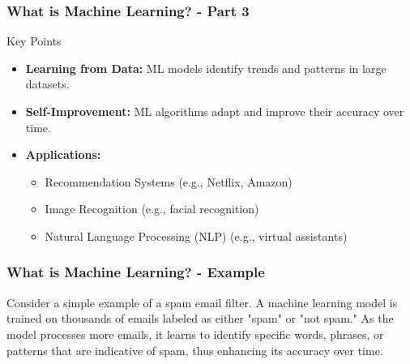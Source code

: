\documentclass[aspectratio=169]{beamer}
\begin{document}
\begin{frame}[fragile]
    \frametitle{What is Machine Learning? - Part 3}
    \begin{block}{Key Points}
        \begin{itemize}
            \item \textbf{Learning from Data:} ML models identify trends and patterns in large datasets.
            \item \textbf{Self-Improvement:} ML algorithms adapt and improve their accuracy over time.
            \item \textbf{Applications:} 
                \begin{itemize}
                    \item Recommendation Systems (e.g., Netflix, Amazon)
                    \item Image Recognition (e.g., facial recognition)
                    \item Natural Language Processing (NLP) (e.g., virtual assistants)
                \end{itemize}
        \end{itemize}
    \end{block}
\end{frame}

\begin{frame}[fragile]
    \frametitle{What is Machine Learning? - Example}
    Consider a simple example of a spam email filter. A machine learning model is trained on thousands of emails labeled as either "spam" or "not spam." As the model processes more emails, it learns to identify specific words, phrases, or patterns that are indicative of spam, thus enhancing its accuracy over time.
\end{frame}

\end{document}
